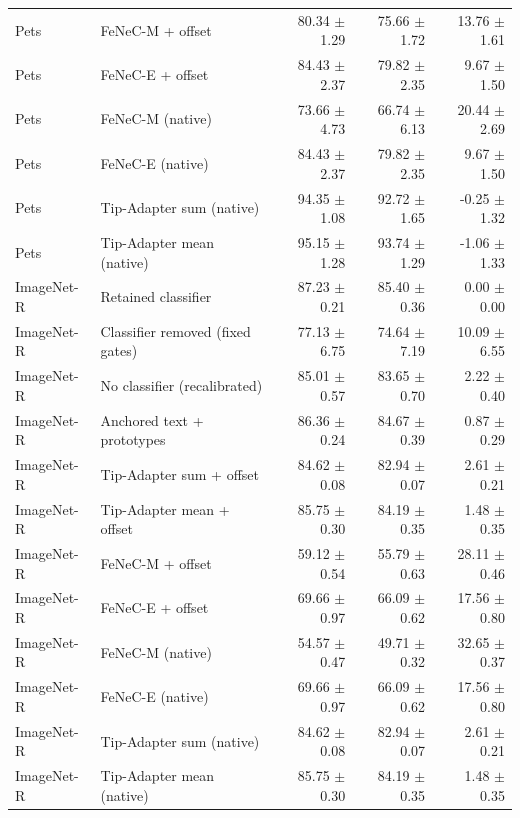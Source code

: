 \begin{tabular}{llrrr}
Pets & FeNeC-M + offset & 80.34 $\pm$ 1.29 & 75.66 $\pm$ 1.72 & 13.76 $\pm$ 1.61 \\
Pets & FeNeC-E + offset & 84.43 $\pm$ 2.37 & 79.82 $\pm$ 2.35 & 9.67 $\pm$ 1.50 \\
Pets & FeNeC-M (native) & 73.66 $\pm$ 4.73 & 66.74 $\pm$ 6.13 & 20.44 $\pm$ 2.69 \\
Pets & FeNeC-E (native) & 84.43 $\pm$ 2.37 & 79.82 $\pm$ 2.35 & 9.67 $\pm$ 1.50 \\
Pets & Tip-Adapter sum (native) & 94.35 $\pm$ 1.08 & 92.72 $\pm$ 1.65 & -0.25 $\pm$ 1.32 \\
Pets & Tip-Adapter mean (native) & 95.15 $\pm$ 1.28 & 93.74 $\pm$ 1.29 & -1.06 $\pm$ 1.33 \\
\midrule
ImageNet-R & Retained classifier & 87.23 $\pm$ 0.21 & 85.40 $\pm$ 0.36 & 0.00 $\pm$ 0.00 \\
ImageNet-R & Classifier removed (fixed gates) & 77.13 $\pm$ 6.75 & 74.64 $\pm$ 7.19 & 10.09 $\pm$ 6.55 \\
ImageNet-R & No classifier (recalibrated) & 85.01 $\pm$ 0.57 & 83.65 $\pm$ 0.70 & 2.22 $\pm$ 0.40 \\
ImageNet-R & Anchored text + prototypes & 86.36 $\pm$ 0.24 & 84.67 $\pm$ 0.39 & 0.87 $\pm$ 0.29 \\
ImageNet-R & Tip-Adapter sum + offset & 84.62 $\pm$ 0.08 & 82.94 $\pm$ 0.07 & 2.61 $\pm$ 0.21 \\
ImageNet-R & Tip-Adapter mean + offset & 85.75 $\pm$ 0.30 & 84.19 $\pm$ 0.35 & 1.48 $\pm$ 0.35 \\
ImageNet-R & FeNeC-M + offset & 59.12 $\pm$ 0.54 & 55.79 $\pm$ 0.63 & 28.11 $\pm$ 0.46 \\
ImageNet-R & FeNeC-E + offset & 69.66 $\pm$ 0.97 & 66.09 $\pm$ 0.62 & 17.56 $\pm$ 0.80 \\
ImageNet-R & FeNeC-M (native) & 54.57 $\pm$ 0.47 & 49.71 $\pm$ 0.32 & 32.65 $\pm$ 0.37 \\
ImageNet-R & FeNeC-E (native) & 69.66 $\pm$ 0.97 & 66.09 $\pm$ 0.62 & 17.56 $\pm$ 0.80 \\
ImageNet-R & Tip-Adapter sum (native) & 84.62 $\pm$ 0.08 & 82.94 $\pm$ 0.07 & 2.61 $\pm$ 0.21 \\
ImageNet-R & Tip-Adapter mean (native) & 85.75 $\pm$ 0.30 & 84.19 $\pm$ 0.35 & 1.48 $\pm$ 0.35 \\
\bottomrule
\end{tabular}
